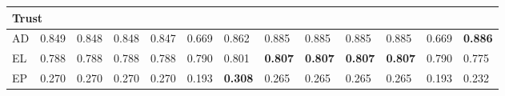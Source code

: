 \begin{longtable}{ lllllllllllll }
\hline
\multicolumn{13}{|l|}{\textbf{Trust}} \\
\hline
\textsf{AD}                   & 0.849 & 0.848 & 0.848 & 0.847 & 0.669 & 0.862 & 0.885 & 0.885 & 0.885 & 0.885 & 0.669 & \bf{0.886} \\
\textsf{EL}                   & 0.788 & 0.788 & 0.788 & 0.788 & 0.790 & 0.801 & \bf{0.807} & \bf{0.807} & \bf{0.807} & \bf{0.807} & 0.790 & 0.775 \\
\textsf{EP}                   & 0.270 & 0.270 & 0.270 & 0.270 & 0.193 & \bf{0.308} & 0.265 & 0.265 & 0.265 & 0.265 & 0.193 & 0.232 \\

      \hline
    \end{longtable} 

